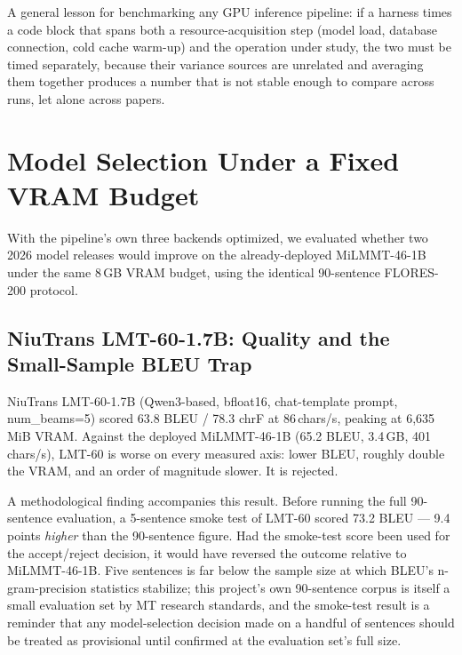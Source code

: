 \documentclass[conference]{IEEEtran}
\newcommand{\MILMMTCLOSEOUTCHS}{401}
\newcommand{\MILMMTBLEU}{65.2}
\newcommand{\LMTBLEU}{63.8}
\newcommand{\LMTCHRF}{78.3}
\newcommand{\LMTCHS}{86}
\newcommand{\LMTVRAM}{6{,}635\,MiB}
\newcommand{\LMTSMOKEBLEU}{73.2}
\begin{document}
A general lesson for benchmarking any GPU inference pipeline: if a
harness times a code block that spans both a resource-acquisition step
(model load, database connection, cold cache warm-up) and the operation
under study, the two must be timed separately, because their variance
sources are unrelated and averaging them together produces a number that
is not stable enough to compare across runs, let alone across papers.

\section{Model Selection Under a Fixed VRAM Budget}
\label{sec:modelselect}

With the pipeline's own three backends optimized, we evaluated whether
two 2026 model releases would improve on the already-deployed
MiLMMT-46-1B under the same 8\,GB VRAM budget, using the identical
90-sentence FLORES-200 protocol.

\subsection{NiuTrans LMT-60-1.7B: Quality and the Small-Sample BLEU Trap}

NiuTrans LMT-60-1.7B (Qwen3-based, bfloat16, chat-template prompt,
num\_beams=5) scored \LMTBLEU{} BLEU / \LMTCHRF{} chrF at \LMTCHS{}\,chars/s,
peaking at \LMTVRAM{} VRAM. Against the deployed MiLMMT-46-1B
(\MILMMTBLEU{} BLEU, 3.4\,GB, \MILMMTCLOSEOUTCHS{}\,chars/s), LMT-60 is
worse on every measured axis: lower BLEU, roughly double the VRAM, and an
order of magnitude slower. It is rejected.

A methodological finding accompanies this result. Before running the full
90-sentence evaluation, a 5-sentence smoke test of LMT-60 scored
\LMTSMOKEBLEU{} BLEU --- 9.4 points \emph{higher} than the 90-sentence
figure. Had the smoke-test score been used for the accept/reject decision,
it would have reversed the outcome relative to MiLMMT-46-1B. Five
sentences is far below the sample size at which BLEU's n-gram-precision
statistics stabilize; this project's own 90-sentence corpus is itself a
small evaluation set by MT research standards, and the smoke-test result
is a reminder that any model-selection decision made on a handful of
sentences should be treated as provisional until confirmed at the
evaluation set's full size.
\end{document}
